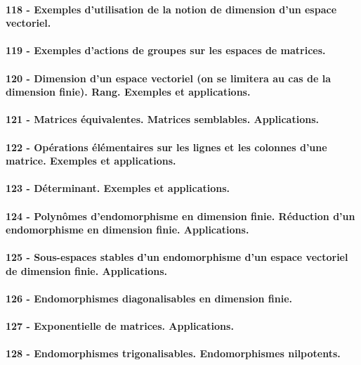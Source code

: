 \paragraph{118 - Exemples d’utilisation de la notion de dimension d’un espace vectoriel.}
\paragraph{119 - Exemples d’actions de groupes sur les espaces de matrices.}
\paragraph{120 - Dimension d’un espace vectoriel (on se limitera au cas de la dimension finie). Rang. Exemples et applications.}
\paragraph{121 - Matrices équivalentes. Matrices semblables. Applications.}
\paragraph{122 - Opérations élémentaires sur les lignes et les colonnes d’une matrice. Exemples et applications.}
\paragraph{123 - Déterminant. Exemples et applications.}
\paragraph{124 - Polynômes d’endomorphisme en dimension finie. Réduction d’un endomorphisme en dimension finie. Applications.}
\paragraph{125 - Sous-espaces stables d’un endomorphisme d’un espace vectoriel de dimension finie. Applications.}
\paragraph{126 - Endomorphismes diagonalisables en dimension finie.}
\paragraph{127 - Exponentielle de matrices. Applications.}
\paragraph{128 - Endomorphismes trigonalisables. Endomorphismes nilpotents.}
